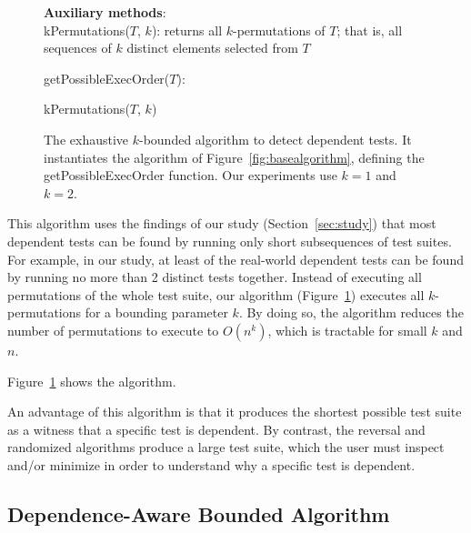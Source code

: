 \begin{figure}[t]
\textbf{Auxiliary methods}:\\
kPermutations($T$, $k$): returns all $k$-permutations of $T$; that is, all
sequences of $k$ distinct elements selected from $T$

\medskip

getPossibleExecOrder($T$):\\
\bigsqueeze
\begin{algorithmic}[1]
\RETURN kPermutations($T$, $k$)
\end{algorithmic}

\caption {The exhaustive $k$-bounded algorithm to detect dependent tests.
It instantiates the algorithm of Figure~\ref{fig:basealgorithm}, defining the
getPossibleExecOrder function.
Our experiments use $k=1$ and $k=2$.
} 
\label{fig:exhaustivealgorithm}
\end{figure}



This algorithm uses the findings of our study
(Section~\ref{sec:study})
that most dependent tests can be found by running only short
subsequences of test suites. For example,
in our study, at least \dtrate of the real-world dependent tests
can be found by running no more than 2 distinct tests together.
Instead of executing all permutations of the
whole test suite, our algorithm (Figure~\ref{fig:exhaustivealgorithm})
executes all $k$-permutations for a bounding
parameter $k$.
By doing so, the algorithm reduces
the number of permutations to execute
to $O(n^k)$, which is tractable for small $k$ and $n$. 


Figure~\ref{fig:exhaustivealgorithm} shows the algorithm.


An advantage of this algorithm is that it produces the shortest possible 
test suite as a witness that a specific test is dependent.  By contrast,
the reversal and randomized algorithms produce a large test suite, which
the user must inspect and/or minimize in order to understand why a specific
test is dependent.


\subsection{Dependence-Aware Bounded Algorithm}
\label{sec:advalgorithm}



